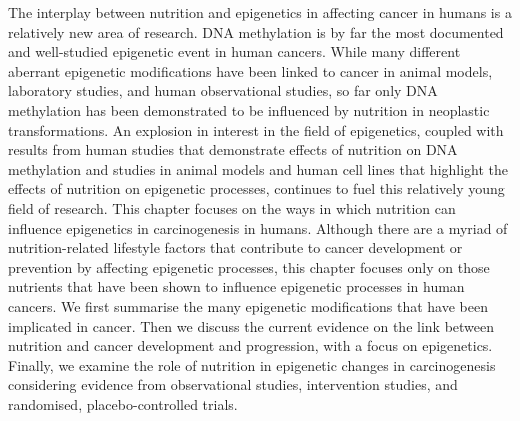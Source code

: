 \noindent The interplay between nutrition and epigenetics in affecting cancer in humans is a relatively new area of research. DNA methylation is by far the most documented and well-studied epigenetic event in human cancers. While many different aberrant epigenetic modifications have been linked to cancer in animal models, laboratory studies, and human observational studies, so far only DNA methylation has been demonstrated to be influenced by nutrition in neoplastic transformations. An explosion in interest in the field of epigenetics, coupled with results from human studies that demonstrate effects of nutrition on DNA methylation and studies in animal models and human cell lines that highlight the effects of nutrition on epigenetic processes, continues to fuel this relatively young field of research. This chapter focuses on the ways in which nutrition can influence epigenetics in carcinogenesis in humans. Although there are a myriad of nutrition-related lifestyle factors that contribute to cancer development or prevention by affecting epigenetic processes, this chapter focuses only on those nutrients that have been shown to influence epigenetic processes in human cancers. We first summarise the many epigenetic modifications that have been implicated in cancer. Then we discuss the current evidence on the link between nutrition and cancer development and progression, with a focus on epigenetics. Finally, we examine the role of nutrition in epigenetic changes in carcinogenesis considering evidence from observational studies, intervention studies, and randomised, placebo-controlled trials.

